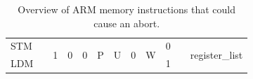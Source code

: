 \documentclass[a4paper,10pt]{report}
\begin{document}
\begin{table}[htb]
\begin{adjustbox}{center}
{\begin{tabular}{l|c|ccc|c|c|c|c|c|c|c|ccccc|cc|c|c|}
		\cline{1-1}\cline{3-10}\cline{12-21}
		STM                                                          &                        & \multirow{2}{*}{1}                   & \multirow{2}{*}{0}                                        & \multirow{2}{*}{0}                                      & \multirow{2}{*}{P}                     & \multirow{2}{*}{U}  & \multirow{2}{*}{0}                                      & \multirow{2}{*}{W}                     & 0                                    &                      & \multicolumn{10}{c|}{\multirow{2}{*}{register\_list}}                                                                                                                                                                                                                                                                                                                                \\ 
		\cline{1-1}\cline{10-10}
		LDM                                                          &                        &                                      &                                                           &                                                         &                                        &                     &                                                         &                                        & 1                                    &                      & \multicolumn{10}{c|}{}                                                                                                                                                                                                                                                                                                                                                               \\
		\hline
		\end{tabular}}
		\end{adjustbox}
		\caption{Overview of ARM memory instructions that could cause an abort.}
	\end{table}
\end{document}
